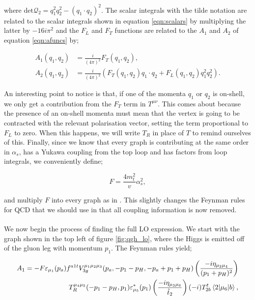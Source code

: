 where $\text{det} \mathcal{Q}_2 =q_1^2q_2^2 - (q_1 \cdot q_2)^2$. The scalar integrals with the tilde notation are related to the scalar integrals shown in equation \ref{eqn:scalars} by multiplying the latter by $-16i\pi^2$ and the $F_L$ and $F_T$ functions are related to the $A_1$ and $A_2$ of equation \ref{eqn:afuncs} by;

\begin{equation}
\begin{split}
A_1(q_1,q_2) &= \frac{i}{(4 \pi)^2}F_T(q_1,q_2), \\
A_2(q_1,q_2) &= \frac{i}{(4 \pi)^2}\left(F_T(q_1,q_2) q_1 \cdot q_2 + F_L(q_1,q_2)q_1^2q_2^2 \right).
\end{split}
\end{equation}

An interesting point to notice is that, if one of the momenta $q_1$ or $q_2$ is on-shell, we only get a contribution from the $F_T$ term in $T^{\mu \nu}$. This comes about because the presence of an on-shell momenta must mean that the vertex is going to be contracted with the relevant polarisation vector, setting the term proportional to $F_L$ to zero. When this happens, we will write $T_R$ in place of $T$ to remind ourselves of this. Finally, since we know that every graph is contributing at the same order in $\alpha_s$, has a Yukawa coupling from the top loop and has factors from loop integrals, we conveniently define;

\begin{equation}
 F = \frac{4 m_t^2}{v} \alpha_s^2, 
\end{equation}

and multiply $F$ into every graph as in \cite{DelDuca2001}. This slightly changes the Feynman rules for QCD that we should use in that all coupling information is now removed.\\
\\
We now begin the process of finding the full LO expression. We start with the graph shown in the top left of figure \ref{fig:qgh_lo}, where the Higgs is emitted off of the gluon leg with momentum $p_1$. The Feynman rules yield;

\begin{equation}
\begin{split}
A_1 = -F \varepsilon_{\mu_1}(p_a)f^{a1t}V_{3g}^{\mu_1 \mu_2 \mu_3}(p_a, -p_1-p_H,-p_a+p_1+p_H)\left(\frac{-i \eta_{\mu_2 \mu_4}}{(p_1+p_H)^2}\right) \\
T_R^{\mu_4 \mu_5}(-p_1-p_H, p_1) \varepsilon^*_{\mu_5}(p_1)\left(\frac{-i \eta_{\mu_3 \mu_6}}{\hat{t}_2}\right)(-i)T^t_{2b}\mathinner{\langle2\vert\mu_6\vert b\rangle}_{},
\end{split}
\end{equation}

